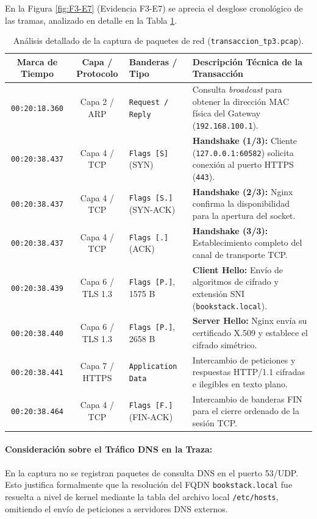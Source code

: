 \documentclass[12pt,a4paper]{article}
\begin{document}
En la Figura \ref{fig:F3-E7} (Evidencia F3-E7) se aprecia el desglose cronológico de las tramas, analizado en detalle en la Tabla \ref{tab:analisis_tcpdump}.

\begin{table}[h!]
\centering
\small
\begin{tabular}{|c|c|p{3.2cm}|p{5.8cm}|}
\hline
\textbf{Marca de Tiempo} & \textbf{Capa / Protocolo} & \textbf{Banderas / Tipo} & \textbf{Descripción Técnica de la Transacción} \\ \hline
\texttt{00:20:18.360} & Capa 2 / ARP & \texttt{Request / Reply} & Consulta \textit{broadcast} para obtener la dirección MAC física del Gateway (\texttt{192.168.100.1}). \\ \hline
\texttt{00:20:38.437} & Capa 4 / TCP & \texttt{Flags [S]} (SYN) & \textbf{Handshake (1/3):} Cliente (\texttt{127.0.0.1:60582}) solicita conexión al puerto HTTPS (\texttt{443}). \\ \hline
\texttt{00:20:38.437} & Capa 4 / TCP & \texttt{Flags [S.]} (SYN-ACK) & \textbf{Handshake (2/3):} Nginx confirma la disponibilidad para la apertura del socket. \\ \hline
\texttt{00:20:38.437} & Capa 4 / TCP & \texttt{Flags [.]} (ACK) & \textbf{Handshake (3/3):} Establecimiento completo del canal de transporte TCP. \\ \hline
\texttt{00:20:38.439} & Capa 6 / TLS 1.3 & \texttt{Flags [P.]}, 1575 B & \textbf{Client Hello:} Envío de algoritmos de cifrado y extensión SNI (\texttt{bookstack.local}). \\ \hline
\texttt{00:20:38.440} & Capa 6 / TLS 1.3 & \texttt{Flags [P.]}, 2658 B & \textbf{Server Hello:} Nginx envía su certificado X.509 y establece el cifrado simétrico. \\ \hline
\texttt{00:20:38.441} & Capa 7 / HTTPS & \texttt{Application Data} & Intercambio de peticiones y respuestas HTTP/1.1 cifradas e ilegibles en texto plano. \\ \hline
\texttt{00:20:38.464} & Capa 4 / TCP & \texttt{Flags [F.]} (FIN-ACK) & Intercambio de banderas FIN para el cierre ordenado de la sesión TCP. \\ \hline
\end{tabular}
\caption{Análisis detallado de la captura de paquetes de red (\texttt{transaccion\_tp3.pcap}).}
\label{tab:analisis_tcpdump}
\end{table}

\paragraph{Consideración sobre el Tráfico DNS en la Traza:}
En la captura no se registran paquetes de consulta DNS en el puerto 53/UDP. Esto justifica formalmente que la resolución del FQDN \texttt{bookstack.local} fue resuelta a nivel de kernel mediante la tabla del archivo local \texttt{/etc/hosts}, omitiendo el envío de peticiones a servidores DNS externos.
\end{document}

